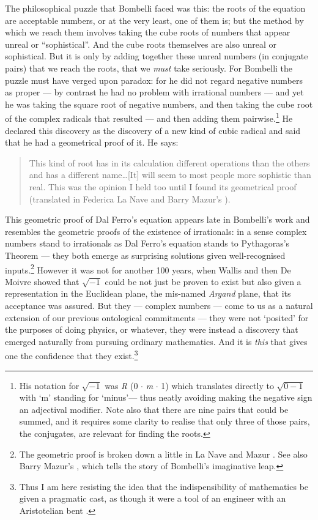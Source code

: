 \documentclass[11pt,oneside,a4paper]{article}
\makeatletter
\newcommand*{\thing}[1]{\hspace{0.75pt}\textit{#1}\hspace{1.5pt}\xspace}
\newcommand{\isqrtwo}[2]{\hspace{0.4ex}\textit{#1}\ensuremath{\sqrt{#2}}\hspace{0.5ex}\xspace}
\newcommand*{\qv}{q.v.\@}
\makeatother
\begin{document}
The philosophical puzzle that Bombelli faced was this: the roots of the equation are acceptable numbers, or at the very least, one of them is; but the method by which we reach them involves taking the cube roots of numbers that appear unreal or ``sophistical''. And the cube roots themselves are also unreal or sophistical. But it is only by adding together these unreal numbers (in conjugate pairs) that we reach the roots, that we \textit{must} take seriously. For Bombelli the puzzle must have verged upon paradox: for he did not regard negative numbers as proper --- by contrast he had no problem with irrational numbers --- and yet he was taking the square root of negative numbers, and then taking the cube root of the complex radicals that resulted --- and then adding them pairwise.\footnote{His notation for $\sqrt{-1}$ was \thing{R} (0 $\cdot$ \thing{m} $\cdot$ 1) which translates directly to $\sqrt{0 - 1}$ with `m' standing for `minus'--- thus neatly avoiding making the negative sign an adjectival modifier. Note also that there are nine pairs that could be summed, and it requires some clarity to realise that only three of those pairs, the conjugates, are relevant for finding the roots.} He declared this discovery as the discovery of a new kind of cubic radical and said that he had a geometrical proof of it. He says:
\begin{quotation}\noindent
This kind of root has in its calculation different operations than the others and has a different name\ldots [It] will seem to most people more sophistic than real. This was the opinion I held too until I found its geometrical proof (translated in Federica La Nave and Barry Mazur's \parencite*{la_nave_reading_2002}).
\end{quotation}
This geometric proof of Dal Ferro's equation appears late in Bombelli's work and resembles the geometric proofs of the existence of irrationals: in a sense complex numbers stand to irrationals as Dal Ferro's equation stands to Pythagoras's Theorem --- they both emerge as surprising solutions given well-recognised inputs.\footnote{The geometric proof is broken down a little in La Nave and Mazur \parencite*[17ff]{la_nave_reading_2002}.  See also Barry Mazur's \parencite*{mazur_imagining_2004}, which tells the story of Bombelli's imaginative leap.} However it was not for another 100 years, when Wallis and then De Moivre showed that \isqrtwo{}{-1} could be not just be proven to exist but also given a representation in the Euclidean plane, the mis-named \textit{Argand} plane, that its acceptance was assured. But they --- \emph{\ie} complex numbers --- come to us as a natural extension of our previous ontological commitments --- they were not `posited' for the purposes of doing physics, or whatever, they were instead a discovery that emerged naturally from pursuing ordinary mathematics. And it is \textit{this} that gives one the confidence that they exist.\footnote{Thus I am here resisting the idea that the indispensibility of mathematics be given a pragmatic cast, as though it were a tool of an engineer with an Aristotelian bent \parencite[\qv,][]{newstead_indispensability_2012}.}
\end{document}
